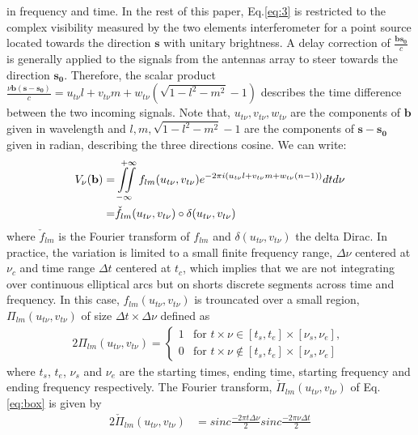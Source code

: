 in frequency and time. 
In the rest of this paper, Eq.\ref{eq:3} is restricted to the complex visibility
measured by the two elements interferometer for a point source located towards the direction 
$\mathbf{s}$ with unitary brightness. A delay correction of $\frac{\mathbf{b}\mathbf{s_0}}{c}$ is 
generally applied to the signals from the antennas 
array to steer towards the direction $\mathbf{s_0}$.
Therefore, the scalar product $\frac{\nu \mathbf{b}(\mathbf{s}-\mathbf{s_0})}{c}=u_{t\nu}l + v_{t\nu}m + w_{t\nu}(\sqrt{1-l^2 - m^2}-1)$
describes the time difference between the two incoming signals. Note that,
$u_{t\nu}, v_{t\nu}, w_{t\nu}$ are the components of  $\mathbf{b}$ 
given in wavelength and $l,m, \sqrt{1-l^2-m^2}-1$ are the components of  $\mathbf{s}-\mathbf{s_0}$ given in radian, describing the 
three directions cosine. 
We can write:
\begin{alignat}{2}
V_{\nu}(\mathbf{b})  =& \iint\limits_{-\infty}^{\hspace{.3cm}+\infty}f_{lm}(u_{t\nu},v_{t\nu})e^{-2\pi i (u_{t\nu}l+v_{t\nu}m+w_{t\nu}(n-1))}dt d\nu\\
		      =& \check{f}_{lm}(u_{t\nu},v_{t\nu})\circ \delta(u_{t\nu},v_{t\nu}) \label{eq:4}
\end{alignat} %
where $\check{f}_{lm}$ is the Fourier transform of $f_{lm}$ and $\delta(u_{t\nu},v_{t\nu})$ the delta Dirac.
In practice, the variation is limited to a small finite frequency range, $\Delta \nu$ centered at $\nu_c$ 
and time range $\Delta t$ centered
at $t_c$, which implies that we are not integrating over continuous elliptical arcs but on shorts discrete
segments across time and frequency. In this case,  $f_{lm}(u_{t\nu},v_{t\nu})$ is trouncated over a small region, $\Pi_{lm}(u_{t\nu},v_{t\nu})$ 
of size $\Delta t \times \Delta \nu$ defined as
\begin{alignat}{2}
\Pi_{lm}(u_{t\nu},v_{t\nu}) = \left\{
\begin{array}{rl}
1 & \mbox{for $\mathit{ t \times \nu \in  [t_s, t_e]\times [\nu_s, \nu_e]}$}, \\
0 & \mbox{for $\mathit{ t \times \nu  \notin [t_s, t_e]\times [\nu_s, \nu_e]}$ }
\end{array}\right.\label{eq:box}
\end{alignat}
where $t_s$, $t_e$, $\nu_s$ and $\nu_e$ are the starting times, ending time, starting frequency and ending frequency
 respectively. The Fourier transform, $\check{\Pi}_{lm}(u_{t\nu},v_{t\nu})$ of Eq.\ref{eq:box} is given by
\begin{alignat*}{2}
\check{\Pi}_{lm}(u_{t\nu},v_{t\nu})&=sinc\frac{-2\pi t\Delta \nu}{2}sinc\frac{-2\pi\nu\Delta t}{2}
\end{alignat*}
